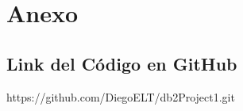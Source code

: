 \documentclass{article}
\begin{document}
  \section{Anexo}
    
    \subsection{Link del Código en GitHub}

      https://github.com/DiegoELT/db2Project1.git
\end{document}
